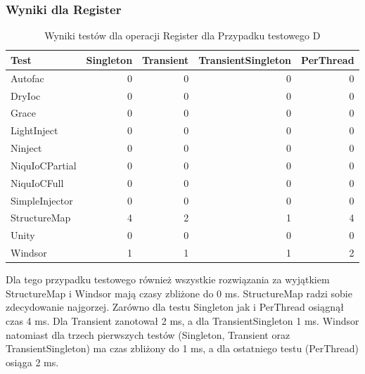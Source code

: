 \documentclass[12pt]{article}
\begin{document}
\subsubsection{Wyniki dla Register}
\begin{table}[H]
\captionsetup{belowskip=0pt,aboveskip=0pt}
\begin{center}
\begin{small}
	\begin{tabular}{ | l | r | r | r | r | }
    		\hline
Test & Singleton & Transient & TransientSingleton & PerThread \\ \hline
Autofac & 0 & 0 & 0 & 0 \\ \hline
DryIoc & 0 & 0 & 0 & 0 \\ \hline
Grace & 0 & 0 & 0 & 0 \\ \hline
LightInject & 0 & 0 & 0 & 0 \\ \hline
Ninject & 0 & 0 & 0 & 0 \\ \hline
NiquIoCPartial & 0 & 0 & 0 & 0 \\ \hline
NiquIoCFull & 0 & 0 & 0 & 0 \\ \hline
SimpleInjector & 0 & 0 & 0 & 0 \\ \hline
StructureMap & 4 & 2 & 1 & 4 \\ \hline
Unity & 0 & 0 & 0 & 0 \\ \hline
Windsor & 1 & 1 & 1 & 2 \\ \hline
  	\end{tabular}
\end{small}
\end{center}
\caption{Wyniki testów dla operacji Register dla Przypadku testowego D}
\label{TestCaseD_Register}
\end{table}
Dla tego przypadku testowego również wszystkie rozwiązania za wyjątkiem StructureMap i Windsor mają czasy zbliżone do 0 ms. StructureMap radzi sobie zdecydowanie najgorzej. Zarówno dla testu Singleton jak i PerThread osiągnął czas 4 ms. Dla Transient zanotował 2 ms, a dla TransientSingleton 1 ms. Windsor natomiast dla trzech pierwszych testów (Singleton, Transient oraz TransientSingleton) ma czas zbliżony do 1 ms, a dla ostatniego testu (PerThread) osiąga 2 ms.
\end{document}
